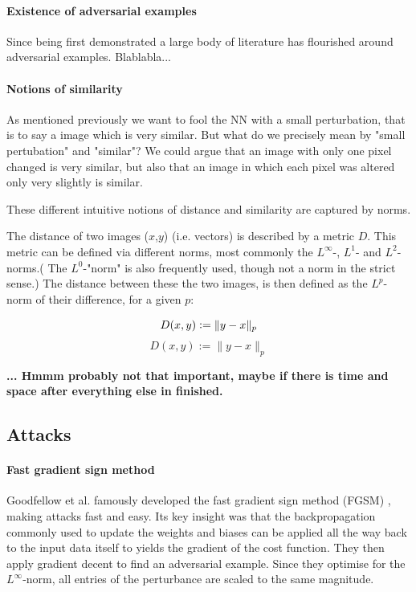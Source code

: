 \documentclass{article}
\newcommand{\defneq}{\mathrel{\mathop:}=}
\begin{document}
\paragraph{Existence of adversarial examples}
Since being first demonstrated \cite{Szegedy13} a large body of literature has flourished around adversarial examples. Blablabla...

\paragraph{Notions of similarity}
As mentioned previously we want to fool the NN with a small perturbation, that is to say a image which is very similar. But what do we precisely mean by "small pertubation" and "similar"? We could argue that an image with only one pixel changed is very similar, but also that an image in which each pixel was altered only very slightly is similar.

These different intuitive notions of distance and similarity are captured by norms.

The distance of two images ($x$,$y$) (i.e. vectors) is described by a metric $D$. This metric can be defined via different norms, most commonly the $L^\infty$-, $L^1$- and $L^2$-norms.( The $L^0$-"norm" is also frequently used, though not a norm in the strict sense.) The distance between these the two images, is then defined as the $L^p$-norm of their difference, for a given $p$:

\begin{equation}
D(x,y) \defneq \norm{y-x}_p %
\end{equation}
\begin{equation}
D(x,y) := \| y - x \|_p %
\end{equation}


\textbf{... Hmmm probably not that important, maybe if there is time and space after everything else in finished.}

\subsection{Attacks}

\paragraph{Fast gradient sign method}
Goodfellow et al. famously developed the fast gradient sign method (FGSM) \cite{goodfellow2014explaining}, making attacks fast and easy. Its key insight was that the backpropagation commonly used to update the weights and biases can be applied all the way back to the input data itself to yields the gradient of the cost function. They then apply gradient decent to find an adversarial example. Since they optimise for the $L^\infty$-norm, all entries of the perturbance are scaled to the same magnitude.
\end{document}
